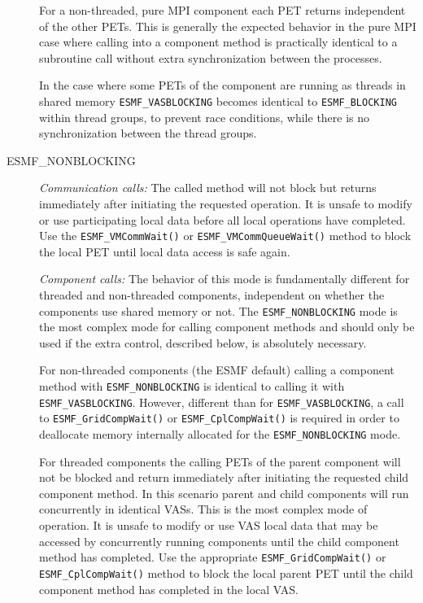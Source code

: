 \begin{description}
         For a non-threaded, pure MPI component each PET returns
         independent of the other PETs. This is generally the expected 
         behavior in the pure MPI case where calling into a component method is
         practically identical to a subroutine call without extra 
         synchronization between the processes.
         
         In the case where some PETs of the component are running as
         threads in shared memory {\tt ESMF\_VASBLOCKING} becomes identical
         to {\tt ESMF\_BLOCKING} within thread groups, to prevent race
         conditions, while there is no synchronization between the thread
         groups.
         
\item [ESMF\_NONBLOCKING]
         {\em Communication calls:} The called method will not block but 
         returns immediately after initiating the requested operation. It is
         unsafe to modify or use participating local data before all local
         operations have completed. Use the {\tt ESMF\_VMCommWait()} or
         {\tt ESMF\_VMCommQueueWait()} method to block the local PET until
         local data access is safe again. 

         {\em Component calls:} The behavior of this mode is fundamentally
         different for threaded and non-threaded components,
         independent on whether the components use shared memory or not.
         The {\tt ESMF\_NONBLOCKING} mode is the most complex mode for
         calling component methods and should only be used if the extra
         control, described below, is absolutely necessary.
         
         For non-threaded components (the ESMF default)
         calling a component method with {\tt ESMF\_NONBLOCKING}
         is identical to calling it with {\tt ESMF\_VASBLOCKING}. However,
         different than for {\tt ESMF\_VASBLOCKING}, a call to
         {\tt ESMF\_GridCompWait()} or {\tt ESMF\_CplCompWait()} is
         required in order to deallocate memory internally allocated for the
         {\tt ESMF\_NONBLOCKING} mode.
         
         For threaded components the calling PETs
         of the parent component will not be blocked and return immediately
         after initiating the requested child component method. In this
         scenario parent and child components will run concurrently in
         identical VASs. This is the most complex mode of operation.
         It is unsafe to modify or use VAS local data that
         may be accessed by concurrently running components until the child
         component method has completed. Use the appropriate
         {\tt ESMF\_GridCompWait()} or {\tt ESMF\_CplCompWait()} method to
         block the local parent PET until the child component method has
         completed in the local VAS.
         

\end{description}

